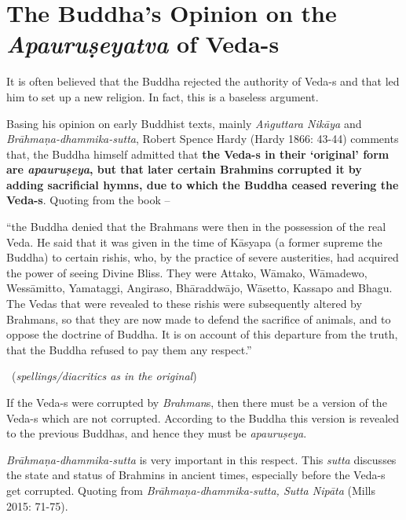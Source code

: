 \section*{The Buddha's Opinion on \hfill\break the \textit{Apauruṣeyatva} of Veda-s}

It is often believed that the Buddha rejected the authority of Veda-s and that led him to set up a new religion. In fact, this is a baseless argument.

Basing his opinion on early Buddhist texts, mainly \textit{Aṅguttara Nikāya} and \textit{Brāhmaṇa-dhammika-sutta}, Robert Spence Hardy (Hardy 1866: 43-44) comments that, the Buddha himself admitted that \textbf{the Veda-s in their ‘original’ form are \textit{apauruṣeya}, but that later certain Brahmins corrupted it by adding sacrificial hymns, due to which the Buddha ceased revering the Veda-s}. Quoting from the book –

\begin{myquote}
“the Buddha denied that the Brahmans were then in the possession of the real Veda. He said that it was given in the time of Kāsyapa (a former supreme the Buddha) to certain rishis, who, by the practice of severe austerities, had acquired the power of seeing Divine Bliss. They were Attako, Wāmako, Wāmadewo, Wessāmitto, Yamataggi, Angiraso, Bhāraddwājo, Wāsetto, Kassapo and Bhagu. The Vedas that were revealed to these rishis were subsequently altered by Brahmans, so that they are now made to defend the sacrifice of animals, and to oppose the doctrine of Buddha. It is on account of this departure from the truth, that the Buddha refused to pay them any respect.” 

~\hfill (\textit{spellings/diacritics as in the original})
\end{myquote}

If the Veda-s were corrupted by \textit{Brahman}s, then there must be a version of the Veda-s which are not corrupted. According to the Buddha this version is revealed to the previous Buddhas, and hence they must be \textit{apauruṣeya}.

\textit{Brāhmaṇa-dhammika-sutta} is very important in this respect. This \textit{sutta} discusses the state and status of Brahmins in ancient times, especially before the Veda-s get corrupted. Quoting from \textit{Brāhmaṇa-dhammika-sutta, Sutta Nipāta} (Mills 2015: 71-75).

